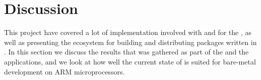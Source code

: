 
\chapter{Discussion}
\label{chap:discussion}

This project have covered a lot of implementation involved with {\rust} and {\C} for the {\gecko}, as well as presenting the ecosystem for building and distributing packages written in {\rust}.
In this section we discuss the results that was gathered as part of the {\tracker} and the {\cg} applications, and we look at how well the current state of {\rust} is suited for bare-metal development on ARM microprocessors.






%
